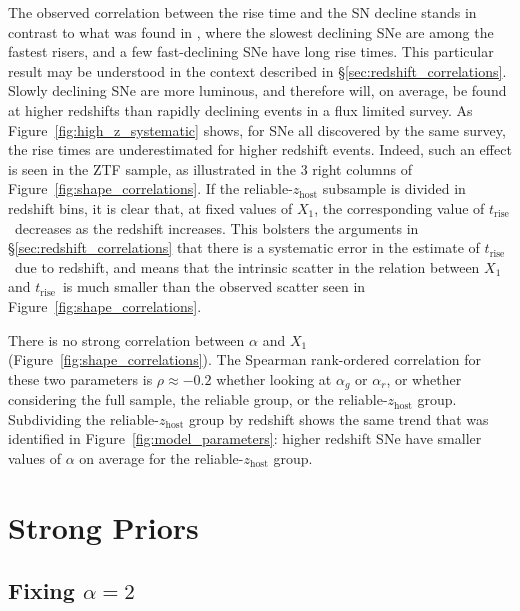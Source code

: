 \documentclass[twocolumn]{./aastex63}
\newcommand{\trise}{$t_\mathrm{rise}$}
\begin{document}
The observed correlation between the rise time and the SN decline stands in
contrast to what was found in \citet{Hayden10}, where the slowest declining
SNe are among the fastest risers, and a few fast-declining SNe have long rise
times. This particular result may be understood in the context described in
\S\ref{sec:redshift_correlations}. Slowly declining SNe are more luminous, and
therefore will, on average, be found at higher redshifts than rapidly
declining events in a flux limited survey. As
Figure~\ref{fig:high_z_systematic} shows, for SNe all discovered by the same
survey, the rise times are underestimated for higher redshift events. Indeed,
such an effect is seen in the ZTF sample, as illustrated in the 3 right
columns of Figure~\ref{fig:shape_correlations}. If the
reliable-$z_\mathrm{host}$ subsample is divided in redshift bins, it is clear
that, at fixed values of $X_1$, the corresponding value of \trise\ decreases
as the redshift increases. This bolsters the arguments in
\S\ref{sec:redshift_correlations} that there is a systematic error in the
estimate of \trise\ due to redshift, and means that the intrinsic scatter in
the relation between $X_1$ and \trise\ is much smaller than the observed
scatter seen in Figure~\ref{fig:shape_correlations}.

There is no strong correlation between $\alpha$ and $X_1$
(Figure~\ref{fig:shape_correlations}). The Spearman rank-ordered correlation
for these two parameters is $\rho \approx -0.2$ whether looking at $\alpha_g$
or $\alpha_r$, or whether considering the full sample, the reliable group, or
the reliable-$z_\mathrm{host}$ group. Subdividing the
reliable-$z_\mathrm{host}$ group by redshift shows the same trend that was
identified in Figure~\ref{fig:model_parameters}: higher redshift SNe have
smaller values of $\alpha$ on average for the reliable-$z_\mathrm{host}$ group.

\section{Strong Priors}\label{sec:strong_priors}

\subsection{Fixing $\alpha = 2$}
\end{document}

